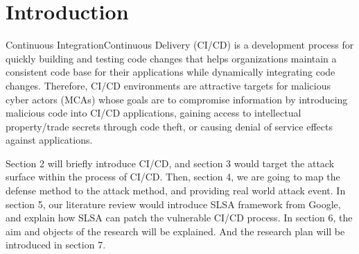 \section{Introduction}
Continuous Integration\/Continuous Delivery (CI/CD) is a development
process for quickly building and testing code changes that helps 
organizations maintain a consistent code base for their applications 
while dynamically integrating code changes. Therefore, CI/CD environments 
are attractive targets for malicious cyber actors (MCAs) whose goals are 
to compromise information by introducing malicious code into CI/CD 
applications, gaining access to intellectual property/trade secrets 
through code theft, or causing denial of service effects against applications.
 
Section 2 will briefly introduce CI/CD, and section 3 would target the attack
surface within the process of CI/CD. Then, section 4, we are going to map the 
defense method to the attack method, and providing real world attack event.
In section 5, our literature review would introduce SLSA framework from Google,
and explain how SLSA can patch the vulnerable CI/CD process. In section 6, the
aim and objects of the research will be explained. And the research plan will be 
introduced in section 7. 


